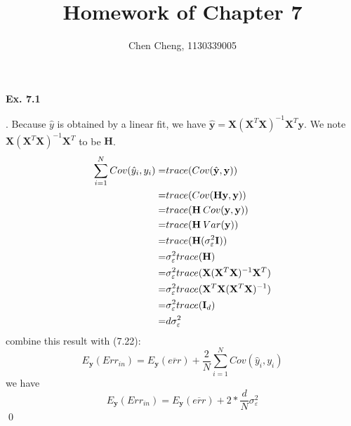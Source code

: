 \documentclass[12pt]{article}
\newenvironment{sol}
  {\par\vspace{3mm}\noindent{\it Solution}.}
  {\qed}
\begin{document}
\author{Chen Cheng, 1130339005}
\title{Homework of Chapter 7}
\maketitle
\begin{flushleft}
\textbf{Ex. 7.1}
\end{flushleft}
\def \Y {\mathbf{Y}}
\def \X {\mathbf{X}}
\def \H {\mathbf{H}}
\begin{sol}
Because $\hat{y}$ is obtained by a linear fit, we have $\hat{\mathbf{y}}=\X(\X^T\X)^{-1}\X^T\mathbf{y}$. We note $\X(\X^T\X)^{-1}\X^T$ to be $\H$.
\begin{equation*}
\begin{split}
\sum_{i=1}^NCov(\hat{y}_i,y_i)=&trace(Cov(\hat{\mathbf{y}},\mathbf{y}))\\
=&trace(Cov(\H \mathbf{y},\mathbf{y}))\\
=&trace(\H \hspace{0.5ex} Cov(\mathbf{y},\mathbf{y}))\\
=&trace(\H \hspace{0.5ex} Var(\mathbf{y}))\\
=&trace(\H(\sigma_\varepsilon^2\mathbf{I}))\\
=&\sigma_\varepsilon^2trace(\H)\\
=&\sigma_\varepsilon^2trace(\X(\X^T\X)^{-1}\X^T)\\
=&\sigma_\varepsilon^2trace(\X^T\X(\X^T\X)^{-1})\\
=&\sigma_\varepsilon^2trace(\mathbf{I}_d)\\
=&d\sigma_\varepsilon^2\\
\end{split}
\end{equation*}
combine this result with (7.22):
$$E_{\mathbf{y}}(Err_{in})=E_{\mathbf{y}}(\overline{err})+\frac{2}{N}\sum_{i=1}^NCov(\hat{y}_i,y_i)$$
we have
$$E_{\mathbf{y}}(Err_{in})=E_{\mathbf{y}}(\overline{err})+2*\frac{d}{N}\sigma_\varepsilon^2$$
\end{sol}
\let \Y \undefined
\let \X \undefined
\let \H \undefined
\end{document}
